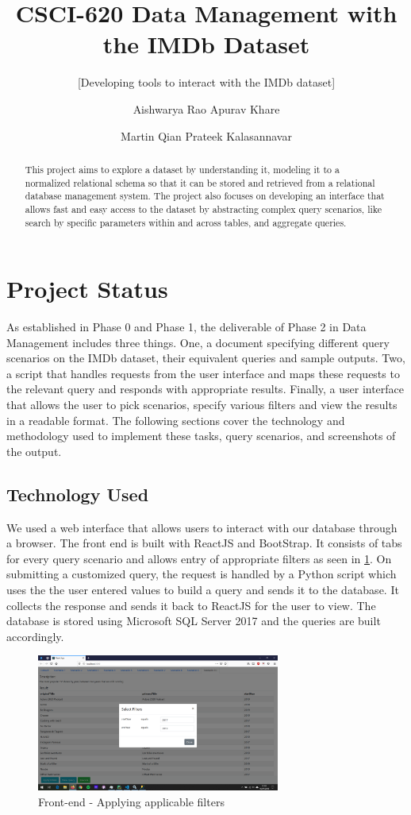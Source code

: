 \documentclass{sig-alternate}
\title{CSCI-620 Data Management with the IMDb Dataset}
\subtitle{[Developing tools to interact with the IMDb dataset]}
\author
{
	\alignauthor
	Aishwarya Rao
	\email{ar2711@rit.edu}
	\alignauthor
	Apurav Khare
	\email{ak2816@rit.edu}
	\and
	\alignauthor
	Martin Qian
	\email{jq3513@rit.edu}
	\alignauthor
	Prateek Kalasannavar
	\email{pk6685@rit.edu}
}
\begin{document}
	\maketitle
	\begin{abstract}
		This project aims to explore a dataset by understanding it, modeling it to a normalized relational schema so that it can be stored and retrieved from a relational database management system. The project also focuses on developing an interface that allows fast and easy access to the dataset by abstracting complex query scenarios, like search by specific parameters within and across tables, and aggregate queries.
	\end{abstract}
	
	\section{Project Status}
	As established in Phase 0 and Phase 1, the deliverable of Phase 2 in Data Management includes three things. One, a document specifying different query scenarios on the IMDb dataset, their equivalent queries and sample outputs. Two, a script that handles requests from the user interface and maps these requests to the relevant query and responds with appropriate results. Finally, a user interface that allows the user to pick scenarios, specify various filters and view the results in a readable format.
	The following sections cover the technology and methodology used to implement these tasks, query scenarios, and screenshots of the output. 
	\subsection{Technology Used}
	We used a web interface that allows users to interact with our database through a browser. The front end is built with ReactJS and BootStrap. It consists of tabs for every query scenario and allows entry of appropriate filters as seen in \ref{frontend}. On submitting a customized query, the request is handled by a Python script which uses the the user entered values to build a query and sends it to the database. It collects the response and sends it back to ReactJS for the user to view. \newline
	The database is stored using Microsoft SQL Server 2017 and the queries are built accordingly.
	\begin{figure}[ht]
		\includegraphics[width=8cm]{Screenshots/Frontend.png}
                \caption{Front-end - Applying applicable filters}
		\label{frontend}
		\centering
	\end{figure}
\end{document}
